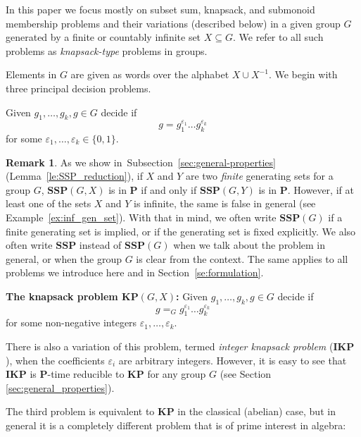 \documentclass[10pt]{amsart}
\theoremstyle{definition}
\newtheorem{remark}[theorem]{Remark}
\def\P{{\mathbf{P}}}
\def\SSP{{\mathbf{SSP}}}
\def\KP{{\mathbf{KP}}}
\def\IKP{{\mathbf{IKP}}}
\begin{document}
In this paper we focus mostly on subset sum, knapsack, and submonoid membership problems and their variations (described below)  in a given group $G$ generated by a finite or countably infinite set  $X \subseteq G$. We refer to all such problems as {\it knapsack-type} problems in groups.

Elements in $G$ are given as words over the alphabet  $X \cup X^{-1}$.
We begin with three principal decision problems.

\medskip
\noindent{\bf The subset sum  problem $\SSP(G,X)$\index{$\SSP(G,X)$}:}
Given $g_1,\ldots,g_k,g\in G$ decide if
  \begin{equation} \label{eq:SSP-def}
  g = g_1^{\varepsilon_1} \ldots g_k^{\varepsilon_k}
  \end{equation}
for some $\varepsilon_1,\ldots,\varepsilon_k \in \{0,1\}$.

\begin{remark}
As we show in~Subsection~\ref{sec:general-properties} (Lemma~\ref{le:SSP_reduction}), if $X$ and $Y$ are two {\em finite} generating sets for a group $G$, $\SSP(G,X)$ is in $\P$ if and only if $\SSP(G,Y)$ is in $\P$. However, if at least one of the sets $X$ and $Y$ is infinite, the same is false in general (see Example~\ref{ex:inf_gen_set}).
With that in mind, we often write $\SSP(G)$ if a finite generating set is implied, or if the generating set is fixed explicitly. We also often write $\SSP$ instead of $\SSP(G)$ when we talk about the problem in general, or when the group $G$ is clear from the context. The same applies to all problems we introduce here and in Section~\ref{se:formulation}.
\end{remark}

\medskip
\noindent
{\bf The knapsack problem $\KP(G,X)$\index{$\KP(G,X)$}:}  Given $g_1,\ldots,g_k,g\in G$
decide if
\begin{equation}\label{eq:IKP-def}
g =_G g_1^{\varepsilon_1} \ldots g_k^{\varepsilon_k}
\end{equation}
for some  non-negative integers $\varepsilon_1,\ldots,\varepsilon_k$.


\medskip

There is also a variation of this problem, termed {\it integer knapsack problem} ($\IKP$), when the coefficients  $\varepsilon_i$ are arbitrary integers. However, it is easy to see that $\IKP$ is $\P$-time reducible to $\KP$ for any group $G$ (see Section   \ref{sec:general_properties}).

The third problem is equivalent to $\KP$ in the classical (abelian) case, but in general it is a completely different problem that is of prime  interest in algebra:
\end{document}
